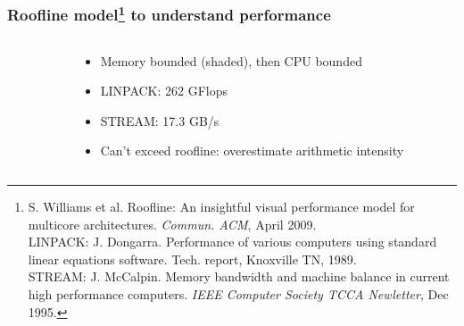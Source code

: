 \documentclass{beamer}
\begin{document}
\begin{frame}
\frametitle{Roofline model\footnote{\tiny S. Williams et al. Roofline: An insightful visual performance model for multicore architectures. \emph{Commun. ACM}, April 2009.\\LINPACK: J. Dongarra. Performance of various computers using standard linear equations software. Tech. report, Knoxville TN, 1989.\\STREAM: J. McCalpin. Memory bandwidth and machine balance in current high performance computers. \emph{IEEE Computer Society TCCA Newletter}, Dec 1995.} to understand performance}

\begin{columns}
\begin{column}{0.48\textwidth}
\begin{center}
\end{center}
\end{column}
\begin{column}{0.48\textwidth}
	\begin{itemize}
		\item Memory bounded (shaded), then CPU bounded
		\item LINPACK: 262 GFlops
		\item STREAM: 17.3 GB/s
		\item Can't exceed roofline: overestimate arithmetic intensity
	\end{itemize}
\end{column}
\end{columns}
\end{frame}
\end{document}
